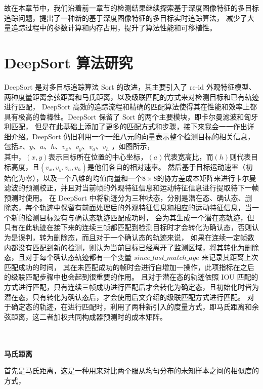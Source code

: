 故在本章节中，我们沿着前一章节的检测结果继续探索基于深度图像特征的多目标追踪问题，提出了一种新的基于深度图像特征的多目标实时追踪算法，
减少了大量追踪过程中的参数计算和内存占用，提升了算法性能和可移植性。

\section{DeepSort 算法研究}
\label{sec3-2}
DeepSort 是对多目标追踪算法 Sort 的改进，其主要引入了 re-id 外观特征模型、两种度量距离余弦距离和马氏距离，以及级联匹配的方式来对检测目标和已有轨迹进行匹配，
DeepSort 高效的追踪流程和精确的匹配算法使得其在性能和效率上都具有极高的鲁棒性。DeepSort 保留了 Sort 的两个主要模块，即卡尔曼滤波和匈牙利匹配，
但是在此基础上添加了更多的匹配方式和步骤，接下来我会一一作出详细介绍。DeepSort 仍旧利用一个一维八元的向量表示整个检测目标的相关信息，
包括$x$、$y$、$a$、$h$、$v_x$、$v_y$、$v_a$、$v_h$ ，如图所示，
\begin{equation}
    [x, y, a, h, vx, vy, va, vh] 
	\label{eq3-1}
\end{equation}
其中，$(x, y)$表示目标所在位置的中心坐标，$(a)$代表宽高比，而$(h)$则代表目标高度，且$(v_x, v_y, v_a, v_h)$是他们各自的相对速率。
然后基于目标运动速率（初始化为零），以及一个八维的均值向量和一个$8 \times 8$的协方差成本矩阵来进行卡尔曼滤波的预测校正，并且对当前帧的外观特征信息和运动特征信息进行提取待下一帧预测时使用。
在 DeepSort 中将轨迹分为三种状态，分别是潜在态、确认态、删除态，每个轨迹中保留有前面处理后的外观特征信息和相应的运动特征信息，当一个新的检测目标没有与确认态轨迹匹配成功时，
会为其生成一个潜在态轨迹，但只有在此轨迹在接下来的连续三帧都匹配到检测目标时才会转化为确认态，否则认为是误判，转为删除态，而且对于一个确认态的轨迹来说，
如果在连续一定帧数内都没有匹配到新的检测，则认为当前目标已经离开了监测区域，将其转化为删除态，且对于每个确认态轨迹都有一个变量 $since\_last\_match\_age$ 来记录其距离上次匹配成功的时间，
其在未匹配成功的帧时会进行自增加一操作，此项指标在之后的级联匹配步骤中也会起到很重要的作用。
且对于潜在态的轨迹依照 IOU 匹配的方式进行匹配，只有连续三帧成功进行匹配后才会转化为确定态，且初始化时皆为潜在态，只有转化为确认态后，才会使用后文介绍的级联匹配方式进行匹配。
对于确定态的轨迹，在进行匹配时，利用了两种新引入的度量方式，即马氏距离和余弦距离，这二者加权共同构成器预测时的成本矩阵。

\\ \hspace*{\fill} \\
\textbf{马氏距离}

首先是马氏距离，这是一种用来对比两个服从均匀分布的未知样本之间的相似度的方式，

